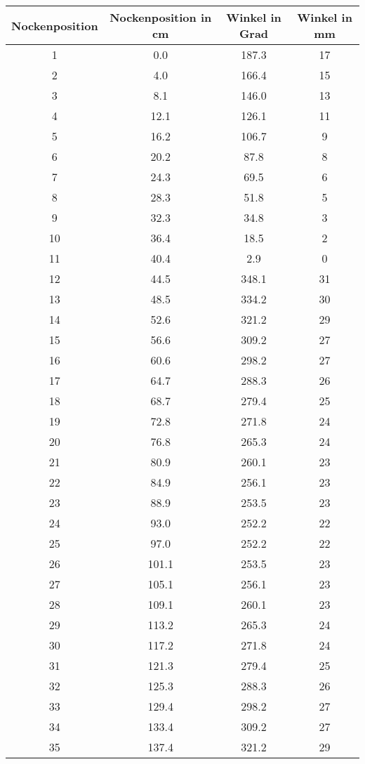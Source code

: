 \documentclass[10pt, a4paper]{article}
\begin{document}
\begin{center}
	\begin{tabular}{c|c|c|c}
		Nockenposition & Nockenposition in cm & Winkel in Grad & Winkel in mm \\
		\hline
		1 & 0.0 & 187.3 & 17 \\
		2 & 4.0 & 166.4 & 15 \\
		3 & 8.1 & 146.0 & 13 \\
		4 & 12.1 & 126.1 & 11 \\
		5 & 16.2 & 106.7 & 9 \\
		6 & 20.2 & 87.8 & 8 \\
		7 & 24.3 & 69.5 & 6 \\
		8 & 28.3 & 51.8 & 5 \\
		9 & 32.3 & 34.8 & 3 \\
		10 & 36.4 & 18.5 & 2 \\
		11 & 40.4 & 2.9 & 0 \\
		12 & 44.5 & 348.1 & 31 \\
		13 & 48.5 & 334.2 & 30 \\
		14 & 52.6 & 321.2 & 29 \\
		15 & 56.6 & 309.2 & 27 \\
		16 & 60.6 & 298.2 & 27 \\
		17 & 64.7 & 288.3 & 26 \\
		18 & 68.7 & 279.4 & 25 \\
		19 & 72.8 & 271.8 & 24 \\
		20 & 76.8 & 265.3 & 24 \\
		21 & 80.9 & 260.1 & 23 \\
		22 & 84.9 & 256.1 & 23 \\
		23 & 88.9 & 253.5 & 23 \\
		24 & 93.0 & 252.2 & 22 \\
		25 & 97.0 & 252.2 & 22 \\
		26 & 101.1 & 253.5 & 23 \\
		27 & 105.1 & 256.1 & 23 \\
		28 & 109.1 & 260.1 & 23 \\
		29 & 113.2 & 265.3 & 24 \\
		30 & 117.2 & 271.8 & 24 \\
		31 & 121.3 & 279.4 & 25 \\
		32 & 125.3 & 288.3 & 26 \\
		33 & 129.4 & 298.2 & 27 \\
		34 & 133.4 & 309.2 & 27 \\
		35 & 137.4 & 321.2 & 29 \\

\end{tabular}
\end{center}
\end{document}

